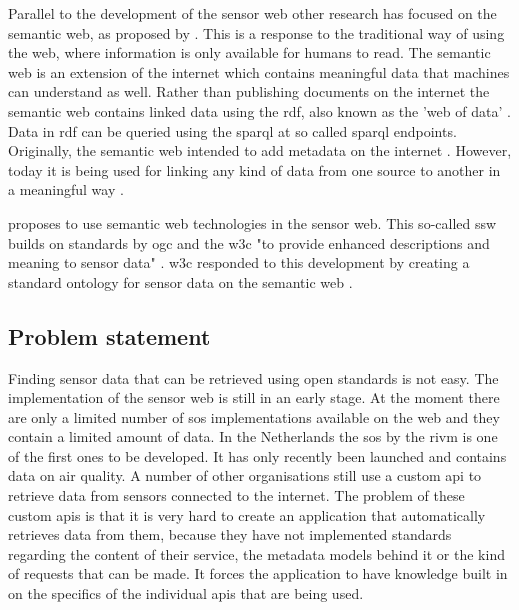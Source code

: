 Parallel to the development of the sensor web other research has focused on the semantic web, as proposed by \cite{LD:Berners-lee}. This is a response to the traditional way of using the web, where information is only available for humans to read. The semantic web is an extension of the internet which contains meaningful data that machines can understand as well. Rather than publishing documents on the internet the semantic web contains linked data using the \ac{rdf}, also known as the 'web of data' \citep{LD:Bizer}. Data in \ac{rdf} can be queried using the \ac{sparql} at so called \ac{sparql} endpoints. Originally, the semantic web intended to add metadata on the internet \citep{LD:W3C}. However, today it is being used for linking any kind of data from one source to another in a meaningful way \citep{LD:Cambridge}. 

\cite{SSW:Sheth} proposes to use semantic web technologies in the sensor web. This so-called \ac{ssw} builds on standards by \ac{ogc} and the \ac{w3c} "to provide enhanced descriptions and meaning to sensor data" \cite[p.78]{SSW:Sheth}. \ac{w3c} responded to this development by creating a standard ontology for sensor data on the semantic web \citep{SSW:SSN_incubatorGroup}. 
 
\subsection{Problem statement}
Finding sensor data that can be retrieved using open standards is not easy. The implementation of the sensor web is still in an early stage. At the moment there are only a limited number of \ac{sos} implementations available on the web and they contain a limited amount of data. In the Netherlands the \ac{sos} by the \ac{rivm} is one of the first ones to be developed. It has only recently been launched and contains data on air quality. A number of other organisations still use a custom \ac{api} to retrieve data from sensors connected to the internet. The problem of these custom \ac{api}s is that it is very hard to create an application that automatically retrieves data from them, because they have not implemented standards regarding the content of their service, the metadata models behind it or the kind of requests that can be made. It forces the application to have knowledge built in on the specifics of the individual \ac{api}s that are being used.  

